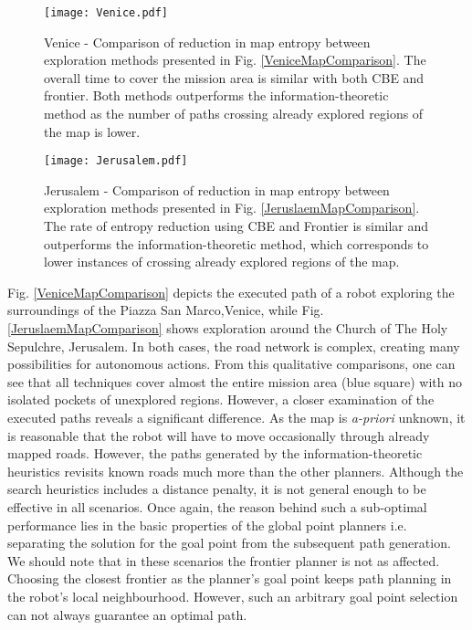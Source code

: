 \documentclass[shortAfour,sageh,times]{sagej_no_sage}
\begin{document}
  \begin{figure}[]
  	
  	\centering
  	
  	\texttt{[image: Venice.pdf]}
  	
  	\caption{Venice - Comparison of reduction in map entropy between exploration methods presented in Fig. \ref{VeniceMapComparison}. The overall time to cover the mission area is similar with both CBE and frontier. Both methods outperforms the information-theoretic method as the number of paths crossing already explored regions of the map is lower.}
  	\label{VeniceComparisonGraph}
  \end{figure}
  
  \begin{figure}[]
  	
  	\centering
  	
  	\texttt{[image: Jerusalem.pdf]}
  	
  	\caption{Jerusalem - Comparison of reduction in map entropy between exploration methods presented in Fig. \ref{JeruslaemMapComparison}. The rate of entropy reduction using CBE and Frontier is similar and outperforms the information-theoretic method, which corresponds to lower instances of crossing already explored regions of the map.}
  	\label{JerusalemComparisonGraph}
  \end{figure}
Fig. \ref{VeniceMapComparison} depicts the executed path of a robot exploring the surroundings of the Piazza San Marco,Venice, while Fig. \ref{JeruslaemMapComparison} shows exploration around the Church of The Holy Sepulchre, Jerusalem. In both cases, the road network is complex, creating many possibilities for autonomous actions. From this qualitative comparisons, one can see that all techniques cover almost the entire mission area (blue square) with no isolated pockets of unexplored regions. However, a closer examination of the executed paths reveals a significant difference. As the map is \textit{a-priori} unknown, it is reasonable that the robot will have to move occasionally through already mapped roads. However, the paths generated by the information-theoretic heuristics revisits known roads much more than the other planners. Although the search heuristics includes a distance penalty, it is not general enough to be effective in all scenarios. Once again, the reason behind such a sub-optimal performance lies in the basic properties of the global point planners i.e. separating the solution for the goal point from the subsequent path generation. We should note that in these scenarios the frontier planner is not as affected. Choosing the closest frontier as the planner's goal point keeps path planning in the robot's local neighbourhood. However, such an arbitrary goal point selection can not always guarantee an optimal path.
   
\end{document}
